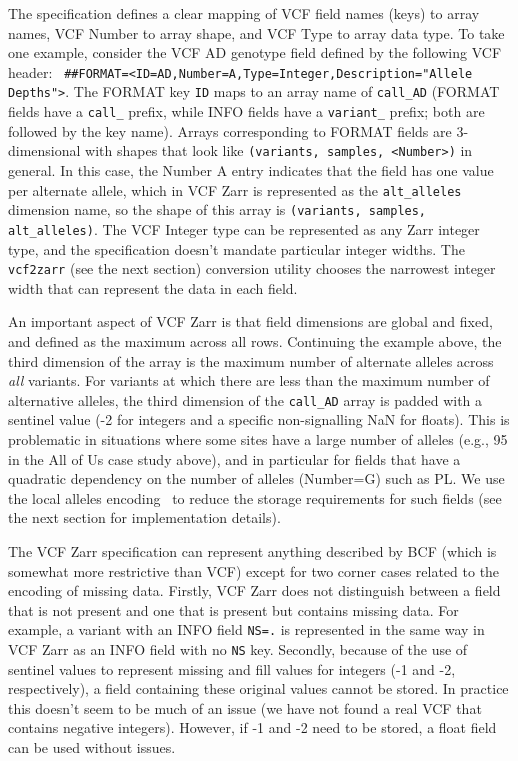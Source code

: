 \documentclass[a4paper,num-refs]{oup-contemporary}
\begin{document}
The specification defines a clear mapping of VCF field names (keys) to
array names, VCF Number to array shape, and VCF Type to array data type.
To take one example, consider the VCF AD genotype field defined by the
following VCF header: \texttt{
\#\#FORMAT=<ID=AD,Number=A,Type=Integer,Description="Allele Depths">}.
The FORMAT key \texttt{ID} maps to an array name of \texttt{call\_AD}
(FORMAT fields have a \texttt{call\_} prefix, while INFO fields have a
\texttt{variant\_} prefix; both are followed by the key name). Arrays
corresponding to FORMAT fields are 3-dimensional with shapes that look
like \texttt{(variants, samples, <Number>)} in general. In this case, the
Number A entry indicates that the field has one value per alternate allele,
which in VCF Zarr is represented as the \texttt{alt\_alleles} dimension name,
so the shape of this array is \texttt{(variants, samples, alt\_alleles)}.
The VCF Integer type can be represented as any Zarr integer type,
and the specification doesn't mandate particular integer widths.
The \texttt{vcf2zarr} (see the next section) conversion utility
chooses the narrowest integer width that can represent the data in
each field.

An important aspect of VCF Zarr is that field dimensions are
global and fixed, and defined as the maximum across all rows.
Continuing the example above, the third dimension of the array
is the maximum number of alternate alleles across \emph{all}
variants. For variants at which there are less than the maximum
number of alternative alleles, the third dimension of the
\texttt{call\_AD} array
is padded with a sentinel value (-2 for integers and a specific
non-signalling NaN for floats). This is problematic in situations
where some sites have a large number of alleles (e.g., 95 in the All
of Us case study above), and 
in particular for fields that have a quadratic dependency on the number of alleles
(Number=G) such as PL. We use the local alleles
encoding~\cite{poterba2025scalable} to reduce the storage 
requirements for such fields (see the next section for 
implementation details).

The VCF Zarr specification can represent anything described by BCF
(which is somewhat more restrictive than VCF) except for two corner
cases related to the encoding of missing data. Firstly, VCF Zarr does
not distinguish between a field that is not present and one that
is present but contains missing data. For example, a variant with an
INFO field \texttt{NS=.} is represented in the same way in VCF Zarr
as an INFO field with no \texttt{NS} key. Secondly, because of the use
of sentinel values to represent missing and fill values for integers
(-1 and -2, respectively), a field containing these original values
cannot be stored. In practice this doesn't seem to be much of
an issue (we have not found a real VCF that contains negative
integers). However, if -1 and -2 need to be stored, a float field
can be used without issues.
\end{document}

